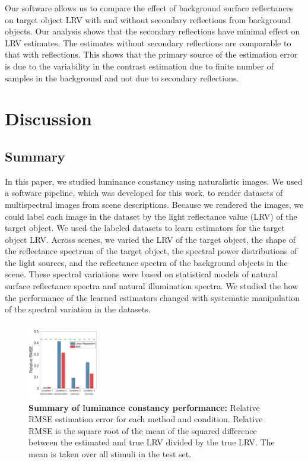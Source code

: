 \documentclass{jov}
\begin{document}
Our software allows us to compare the effect of background surface reflectances on target object LRV with and without secondary reflections from background objects. 
Our analysis shows that the secondary reflections have minimal effect on LRV estimates.
The estimates without secondary reflections are comparable to that with reflections.
This shows that the primary source of the estimation error is due to the variability in the contrast estimation due to finite number of samples in the background and not due to secondary reflections.


\section{Discussion} \label{Discussion}

\subsection{Summary}

In this paper, we studied luminance constancy using naturalistic images.
We used a software pipeline, which was developed for this work, to render datasets of multispectral images from scene descriptions.
Because we rendered the images, we could label each image in the dataset by the light reflectance value (LRV) of the target object.
We used the labeled datasets to learn estimators for the target object LRV.
Across scenes, we varied the LRV of the target object, the shape of the reflectance spectrum of the target object, 
the spectral power distributions of the light sources, and the reflectance spectra of the background objects in the scene.
These spectral variations were based on statistical models of natural surface reflectance spectra and natural illumination spectra.
We studied the how the performance of the learned estimators changed with systematic manipulation of the spectral variation in the datasets.


\begin{figure}
\centering
\includegraphics[width=0.3\textwidth]{../FiguresDraft5/Figure14/Figure14.pdf}
\caption{{\bf Summary of luminance constancy performance:} Relative RMSE estimation error for each method and condition. Relative RMSE is the square root of the mean of the squared difference between the estimated and true LRV divided by the true LRV. The mean is taken over all stimuli in the test set.}
 \label{fig:barGraphs}
\end{figure}
\end{document}
